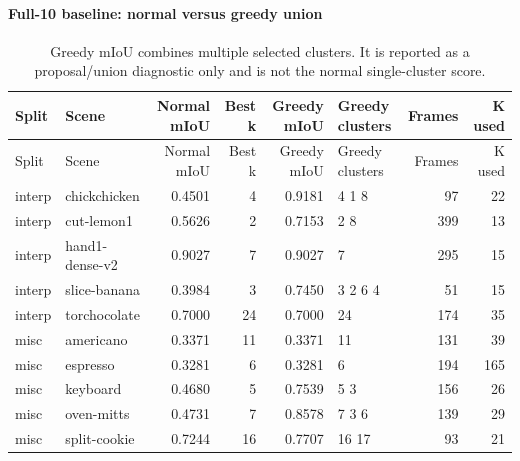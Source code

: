 \documentclass[10pt]{article}
\begin{document}
\paragraph{Full-10 baseline: normal versus greedy union}
\small
\begin{longtable}{llrrrlrr}
\caption{Greedy mIoU combines multiple selected clusters.  It is reported as a proposal/union diagnostic only and is not the normal single-cluster score.}\\
\toprule
Split & Scene & Normal mIoU & Best k & Greedy mIoU & Greedy clusters & Frames & K used \\
\midrule
\endfirsthead
\toprule
Split & Scene & Normal mIoU & Best k & Greedy mIoU & Greedy clusters & Frames & K used \\
\midrule
\endhead
interp & chickchicken & 0.4501 & 4 & 0.9181 & 4 1 8 & 97 & 22 \\
interp & cut-lemon1 & 0.5626 & 2 & 0.7153 & 2 8 & 399 & 13 \\
interp & hand1-dense-v2 & 0.9027 & 7 & 0.9027 & 7 & 295 & 15 \\
interp & slice-banana & 0.3984 & 3 & 0.7450 & 3 2 6 4 & 51 & 15 \\
interp & torchocolate & 0.7000 & 24 & 0.7000 & 24 & 174 & 35 \\
misc & americano & 0.3371 & 11 & 0.3371 & 11 & 131 & 39 \\
misc & espresso & 0.3281 & 6 & 0.3281 & 6 & 194 & 165 \\
misc & keyboard & 0.4680 & 5 & 0.7539 & 5 3 & 156 & 26 \\
misc & oven-mitts & 0.4731 & 7 & 0.8578 & 7 3 6 & 139 & 29 \\
misc & split-cookie & 0.7244 & 16 & 0.7707 & 16 17 & 93 & 21 \\
\bottomrule
\end{longtable}
\normalsize
\end{document}
